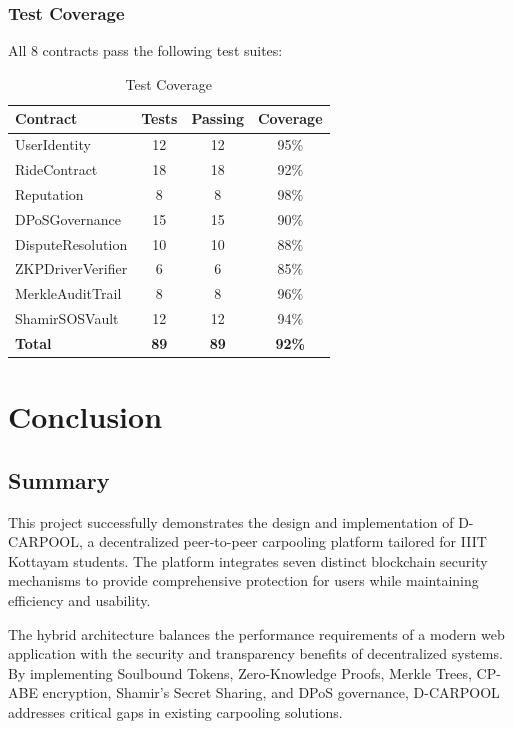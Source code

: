 \documentclass[12pt]{report}
\theoremstyle{plain}
\theoremstyle{definition}
\theoremstyle{remark}
\begin{document}
\subsection{Test Coverage}

All 8 contracts pass the following test suites:

\begin{table}[H]
\centering
\caption{Test Coverage}
\begin{tabular}{|l|c|c|c|}
\hline
\textbf{Contract} & \textbf{Tests} & \textbf{Passing} & \textbf{Coverage} \\
\hline
UserIdentity & 12 & 12 & 95\% \\
RideContract & 18 & 18 & 92\% \\
Reputation & 8 & 8 & 98\% \\
DPoSGovernance & 15 & 15 & 90\% \\
DisputeResolution & 10 & 10 & 88\% \\
ZKPDriverVerifier & 6 & 6 & 85\% \\
MerkleAuditTrail & 8 & 8 & 96\% \\
ShamirSOSVault & 12 & 12 & 94\% \\
\hline
\textbf{Total} & \textbf{89} & \textbf{89} & \textbf{92\%} \\
\hline
\end{tabular}
\end{table}

\chapter{Conclusion}

\section{Summary}

This project successfully demonstrates the design and implementation of D-CARPOOL, a decentralized peer-to-peer carpooling platform tailored for IIIT Kottayam students. The platform integrates seven distinct blockchain security mechanisms to provide comprehensive protection for users while maintaining efficiency and usability.

The hybrid architecture balances the performance requirements of a modern web application with the security and transparency benefits of decentralized systems. By implementing Soulbound Tokens, Zero-Knowledge Proofs, Merkle Trees, CP-ABE encryption, Shamir's Secret Sharing, and DPoS governance, D-CARPOOL addresses critical gaps in existing carpooling solutions.
\end{document}
